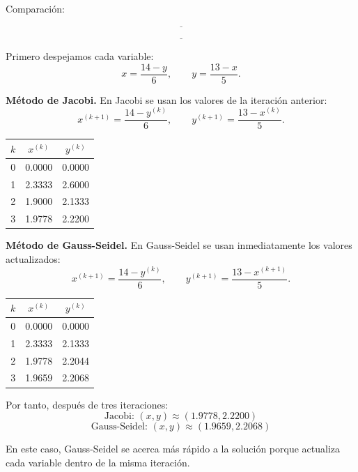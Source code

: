 \documentclass[11pt,respuestas,a4]{aleph-examen}
\begin{document}
\begin{preguntas}
Comparación:

\[
\underline{\hspace{14cm}}
\]

\[
\underline{\hspace{14cm}}
\]

\begin{respuesta}
Primero despejamos cada variable:
\[
x=\frac{14-y}{6},
\qquad
y=\frac{13-x}{5}.
\]

\textbf{Método de Jacobi.} En Jacobi se usan los valores de la iteración anterior:
\[
x^{(k+1)}=\frac{14-y^{(k)}}{6},
\qquad
y^{(k+1)}=\frac{13-x^{(k)}}{5}.
\]

\begin{center}
\renewcommand{\arraystretch}{1.3}
\begin{tabular}{c|c|c}
\toprule
$k$ & $x^{(k)}$ & $y^{(k)}$ \\
\midrule
0 & 0.0000 & 0.0000 \\
1 & 2.3333 & 2.6000 \\
2 & 1.9000 & 2.1333 \\
3 & 1.9778 & 2.2200 \\
\bottomrule
\end{tabular}
\end{center}

\textbf{Método de Gauss-Seidel.} En Gauss-Seidel se usan inmediatamente los valores actualizados:
\[
x^{(k+1)}=\frac{14-y^{(k)}}{6},
\qquad
y^{(k+1)}=\frac{13-x^{(k+1)}}{5}.
\]

\begin{center}
\renewcommand{\arraystretch}{1.3}
\begin{tabular}{c|c|c}
\toprule
$k$ & $x^{(k)}$ & $y^{(k)}$ \\
\midrule
0 & 0.0000 & 0.0000 \\
1 & 2.3333 & 2.1333 \\
2 & 1.9778 & 2.2044 \\
3 & 1.9659 & 2.2068 \\
\bottomrule
\end{tabular}
\end{center}

Por tanto, después de tres iteraciones:
\[
\boxed{\text{Jacobi: }(x,y)\approx(1.9778,2.2200)}
\]
\[
\boxed{\text{Gauss-Seidel: }(x,y)\approx(1.9659,2.2068)}
\]

En este caso, Gauss-Seidel se acerca más rápido a la solución porque actualiza cada variable dentro de la misma iteración.
\end{respuesta}


\end{preguntas}
\end{document}
